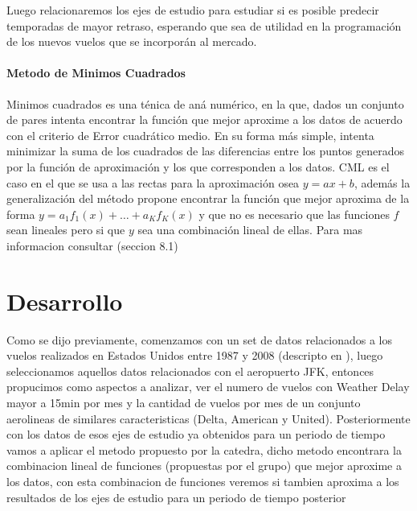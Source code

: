 \documentclass{endm}
\begin{document}
Luego relacionaremos los ejes de estudio para estudiar si es posible predecir temporadas de mayor retraso, esperando que sea de utilidad en la programaci\'on de los nuevos vuelos que se incorporán al mercado.


\paragraph{Metodo de Minimos Cuadrados}

Minimos cuadrados es una t\'enica de an\'a num\'erico, en la que, dados un conjunto de pares intenta encontrar la funci\'on que mejor aproxime a los datos de acuerdo con el criterio de Error cuadr\'atico medio. En su forma m\'as simple, intenta minimizar la suma de los cuadrados de las diferencias entre los puntos generados por la funci\'on de aproximaci\'on y los que corresponden a los datos. CML es el caso en el que se usa a las rectas para la aproximaci\'on osea $y = ax + b$, adem\'as la generalizaci\'on del m\'etodo propone encontrar la funci\'on que mejor aproxima de la forma $y = a_1f_1(x) + \dots + a_Kf_K(x)$ y que no es necesario que las funciones $f$ sean lineales pero si que $y$ sea una combinaci\'on lineal de ellas. Para mas informacion consultar  \cite{bf} (seccion 8.1)

\section{Desarrollo}

	Como se dijo previamente, comenzamos con un set de datos relacionados a los vuelos realizados en Estados Unidos entre 1987 y 2008 (descripto en \cite{d}), luego seleccionamos aquellos datos relacionados con el aeropuerto JFK, entonces propucimos como aspectos a analizar, ver el numero de vuelos con Weather Delay mayor a 15min por mes y la cantidad de vuelos por mes de un conjunto aerolineas de similares caracteristicas (Delta, American y United). Posteriormente con los datos de esos ejes de estudio ya obtenidos para un periodo de tiempo vamos a aplicar el metodo propuesto por la catedra, dicho metodo encontrara la combinacion lineal de funciones (propuestas por el grupo) que mejor aproxime a los datos, con esta combinacion de funciones veremos si tambien aproxima a los resultados de los ejes de estudio para un periodo de tiempo posterior
\end{document}
